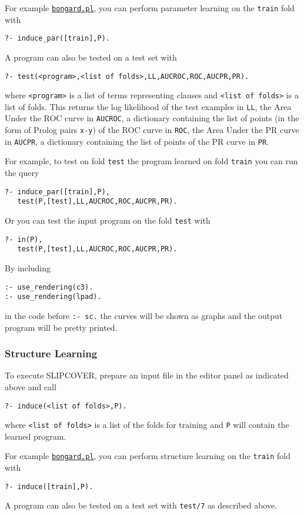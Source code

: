 \documentclass[a4paper,10pt]{scrartcl}
\begin{document}
For example \href{http://cplint.lamping.unife.it/example/bongard.pl}{\texttt{bongard.pl}}, you can 
perform parameter learning on the \verb|train| fold with 
\begin{verbatim}
?- induce_par([train],P).
\end{verbatim}
A program can also be tested on a test set with
\begin{verbatim}
?- test(<program>,<list of folds>,LL,AUCROC,ROC,AUCPR,PR).
\end{verbatim}
where \verb|<program>| is a list of terms representing clauses and
\verb|<list of folds>| is a list of folds.
This returns the log likelihood of the test examples in \verb|LL|, the Area Under the ROC curve in \verb|AUCROC|, a dictionary containing the list of points (in the form of Prolog pairs \verb|x-y|) of the ROC curve in \verb|ROC|,
the Area Under the PR curve in \verb|AUCPR|, a dictionary containing the list of points of the PR curve in \verb|PR|.

For example, to test on fold \verb|test| the program learned on fold \verb|train| you can run the query
\begin{verbatim}
?- induce_par([train],P),
   test(P,[test],LL,AUCROC,ROC,AUCPR,PR).
\end{verbatim}
Or you can test the input program on the fold \verb|test| with
\begin{verbatim}
?- in(P),
   test(P,[test],LL,AUCROC,ROC,AUCPR,PR).
\end{verbatim}
By including
\begin{verbatim}
:- use_rendering(c3).
:- use_rendering(lpad).
\end{verbatim}
in the code before \verb|:- sc.| the curves will be shown as graphs and the output program will be pretty printed.



\subsubsection{Structure Learning}
To execute SLIPCOVER,
prepare an input file in the editor panel as indicated above 
and call
\begin{verbatim}
?- induce(<list of folds>,P).
\end{verbatim}
where \verb|<list of folds>| is a list of the folds for training and
\verb|P| will contain the learned program.

For example \href{http://cplint.lamping.unife.it/example/bongard.pl}{\texttt{bongard.pl}}, you can perform structure learning on the \verb|train| fold with 
\begin{verbatim}
?- induce([train],P).
\end{verbatim}
A program can also be tested on a test set with \verb|test/7| as
described above.
\end{document}
